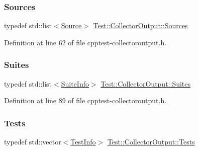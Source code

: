 \subsubsection{\texorpdfstring{Sources}{Sources}}
{\footnotesize\ttfamily typedef std\+::list$<$\mbox{\hyperlink{class_test_1_1_source}{Source}}$>$ \mbox{\hyperlink{class_test_1_1_collector_output_a1921f35e0da596bd75da5824afe872c9}{Test\+::\+Collector\+Output\+::\+Sources}}\hspace{0.3cm}{\ttfamily [protected]}}



Definition at line 62 of file cpptest-\/collectoroutput.\+h.

\mbox{\label{class_test_1_1_collector_output_a0879ce3b51f1e3b3fe14aa5665dccd30}} 
\subsubsection{\texorpdfstring{Suites}{Suites}}
{\footnotesize\ttfamily typedef std\+::list$<$\mbox{\hyperlink{struct_test_1_1_collector_output_1_1_suite_info}{Suite\+Info}}$>$ \mbox{\hyperlink{class_test_1_1_collector_output_a0879ce3b51f1e3b3fe14aa5665dccd30}{Test\+::\+Collector\+Output\+::\+Suites}}\hspace{0.3cm}{\ttfamily [protected]}}



Definition at line 89 of file cpptest-\/collectoroutput.\+h.

\mbox{\label{class_test_1_1_collector_output_a54a7b7c9b6d181102bc8934190b06e86}} 
\subsubsection{\texorpdfstring{Tests}{Tests}}
{\footnotesize\ttfamily typedef std\+::vector$<$\mbox{\hyperlink{struct_test_1_1_collector_output_1_1_test_info}{Test\+Info}}$>$ \mbox{\hyperlink{class_test_1_1_collector_output_a54a7b7c9b6d181102bc8934190b06e86}{Test\+::\+Collector\+Output\+::\+Tests}}\hspace{0.3cm}{\ttfamily [protected]}}



